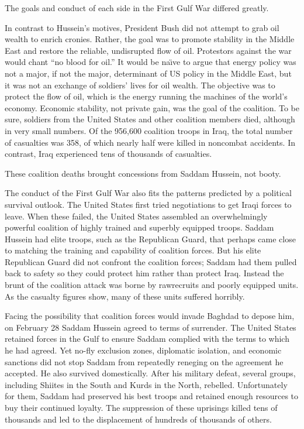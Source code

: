 \documentclass[10pt]{article}
\begin{document}
{\large The goals and conduct of each side in the First Gulf War differed
greatly.}

{\large In contrast to Hussein's motives, President Bush did not attempt to grab
oil wealth to enrich cronies. Rather, the goal was to promote stability in the
Middle East and restore the reliable, undisrupted flow of oil. Protestors against
the war would chant ``no blood for oil.'' It would be na\"{\i}ve to argue that
energy policy was not a major, if not the major, determinant of US policy in the
Middle East, but it was not an exchange of soldiers' lives for oil wealth. The
objective was to protect the flow of oil, which is the energy running the
machines of the world's economy. Economic stability, not private gain, was the
goal of the coalition. To be sure, soldiers from the United States and other
coalition members died, although in very small numbers. Of the 956,600 coalition
troops in Iraq, the total number of casualties was 358, of which nearly half were
killed in noncombat accidents. In contrast, Iraq experienced tens of thousands of
casualties.}

{\large These coalition deaths brought concessions from Saddam Hussein, not
booty.}

{\large The conduct of the First Gulf War also fits the patterns predicted by a
political survival outlook. The United States first tried negotiations to get
Iraqi forces to leave. When these failed, the United States assembled an
overwhelmingly powerful coalition of highly trained and superbly equipped troops.
Saddam Hussein had elite troops, such as the Republican Guard, that perhaps came
close to matching the training and capability of coalition forces. But his elite
Republican Guard did not confront the coalition forces; Saddam had them pulled
back to safety so they could protect him rather than protect Iraq. Instead the
brunt of the coalition attack was borne by rawrecruits and poorly equipped units.
As the casualty figures show, many of these units suffered horribly.}

{\large Facing the possibility that coalition forces would invade Baghdad to
depose him, on February 28 Saddam Hussein agreed to terms of surrender. The
United States retained forces in the Gulf to ensure Saddam complied with the
terms to which he had agreed. Yet no-fly exclusion zones, diplomatic isolation,
and economic sanctions did not stop Saddam from repeatedly reneging on the
agreement he accepted. He also survived domestically. After his military defeat,
several groups, including Shiites in the South and Kurds in the North, rebelled.
Unfortunately for them, Saddam had preserved his best troops and retained enough
resources to buy their continued loyalty. The suppression of these uprisings
killed tens of thousands and led to the displacement of hundreds of thousands of
others.}
\end{document}
